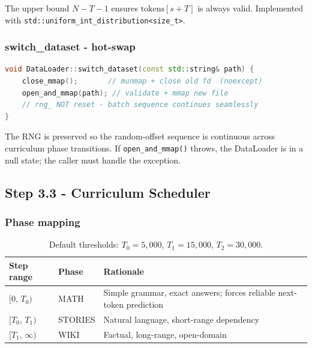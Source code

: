 \documentclass[12pt, a4paper]{article}
\begin{document}
The upper bound \(N - T - 1\) ensures \(\text{tokens}[s + T]\) is always valid.
Implemented with \texttt{std::uniform\_int\_distribution\textless size\_t\textgreater}.

\subsubsection{switch\_dataset - hot-swap}

\begin{tcolorbox}[codebox, title={Zero-downtime dataset transition}]
\begin{lstlisting}[language=C++]
void DataLoader::switch_dataset(const std::string& path) {
    close_mmap();       // munmap + close old fd  (noexcept)
    open_and_mmap(path); // validate + mmap new file
    // rng_ NOT reset - batch sequence continues seamlessly
}
\end{lstlisting}
The RNG is preserved so the random-offset sequence is continuous across
curriculum phase transitions.  If \texttt{open\_and\_mmap()} throws, the
DataLoader is in a null state; the caller must handle the exception.
\end{tcolorbox}

\subsection{Step 3.3 - Curriculum Scheduler}

\subsubsection{Phase mapping}

\begin{table}[!ht]
\centering
\renewcommand{\arraystretch}{1.3}
\begin{tabular}{@{} l l p{10cm} @{}}
\toprule
\textbf{Step range} & \textbf{Phase} & \textbf{Rationale} \\
\midrule
\([0,\, T_0)\) & MATH    & Simple grammar, exact answers; forces reliable next-token prediction \\
\([T_0,\, T_1)\) & STORIES & Natural language, short-range dependency \\
\([T_1,\, \infty)\) & WIKI    & Factual, long-range, open-domain \\
\bottomrule
\end{tabular}
\caption{Default thresholds: \(T_0 = 5{,}000\), \(T_1 = 15{,}000\), \(T_2 = 30{,}000\).}
\end{table}
\end{document}
